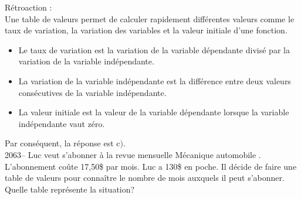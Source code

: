 \documentclass[letterpaper, 12pt]{article}
\begin{document}
R\'etroaction :\\
Une table de valeurs permet de calculer rapidement diff\'erentes valeurs comme le taux de variation, la variation des variables et la valeur initiale d'une fonction.\\
\begin{itemize}
 \item Le taux de variation est la variation de la variable d\'ependante divis\'e par la variation de la variable ind\'ependante.
\item La variation de la variable ind\'ependante est la diff\'erence entre deux valeurs cons\'ecutives de la variable ind\'ependante.
\item La valeur initiale est la valeur de la variable d\'ependante lorsque la variable ind\'ependante vaut z\'ero.
\end{itemize}
Par cons\'equent, la r\'eponse est c$)$.\\

2063--  Luc veut s'abonner \`a la revue mensuelle \og M\'ecanique automobile \fg. L'abonnement co\^ute 17,50\$ par mois. Luc a 130\$ en poche. Il d\'ecide de faire une table de valeurs pour conna\^itre le nombre de mois auxquels il peut s'abonner. \\
Quelle table repr\'esente la situation?\\
\end{document}
